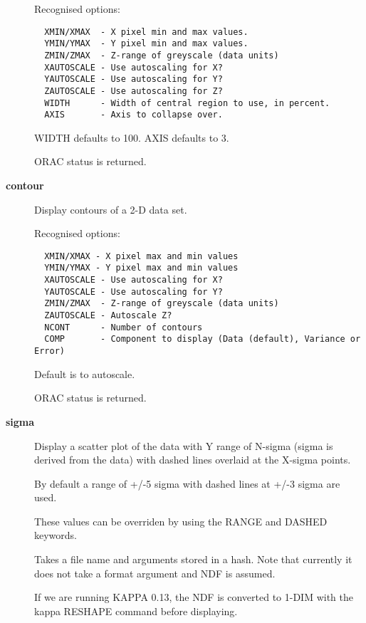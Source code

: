 \begin{description}
Recognised options:

\begin{verbatim}
  XMIN/XMAX  - X pixel min and max values.
  YMIN/YMAX  - Y pixel min and max values.
  ZMIN/ZMAX  - Z-range of greyscale (data units)
  XAUTOSCALE - Use autoscaling for X?
  YAUTOSCALE - Use autoscaling for Y?
  ZAUTOSCALE - Use autoscaling for Z?
  WIDTH      - Width of central region to use, in percent.
  AXIS       - Axis to collapse over.
\end{verbatim}


WIDTH defaults to 100. AXIS defaults to 3.



ORAC status is returned.


\item[{\textbf{contour}}] \mbox{}

Display contours of a 2-D data set.



Recognised options:

\begin{verbatim}
  XMIN/XMAX - X pixel max and min values
  YMIN/YMAX - Y pixel max and min values
  XAUTOSCALE - Use autoscaling for X?
  YAUTOSCALE - Use autoscaling for Y?
  ZMIN/ZMAX  - Z-range of greyscale (data units)
  ZAUTOSCALE - Autoscale Z?
  NCONT      - Number of contours
  COMP       - Component to display (Data (default), Variance or Error)
\end{verbatim}


Default is to autoscale.



ORAC status is returned.


\item[{\textbf{sigma}}] \mbox{}

Display a scatter plot of the data with Y range of N-sigma (sigma
is derived from the data) with dashed lines overlaid at the X-sigma
points.



By default a range of +/-5 sigma with dashed lines at +/-3 sigma
are used.



These values can be overriden by using the RANGE and DASHED 
keywords.



Takes a file name and arguments stored in a hash.
Note that currently it does not take a format argument
and NDF is assumed.



If we are running KAPPA 0.13, the NDF is converted
to 1-DIM with the kappa RESHAPE command before 
displaying.




\end{description}
